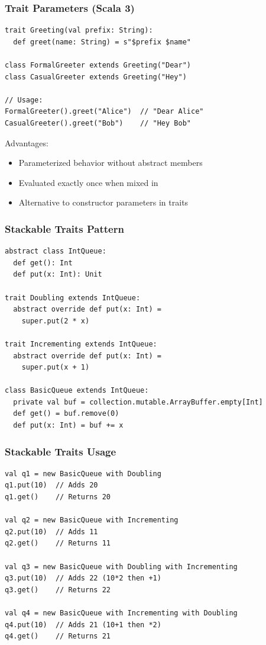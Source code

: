 \documentclass{beamer}
\begin{document}
\begin{frame}[fragile]
\frametitle{Trait Parameters (Scala 3)}
\begin{lstlisting}[style=scala]
trait Greeting(val prefix: String):
  def greet(name: String) = s"$prefix $name"

class FormalGreeter extends Greeting("Dear")
class CasualGreeter extends Greeting("Hey")

// Usage:
FormalGreeter().greet("Alice")  // "Dear Alice"
CasualGreeter().greet("Bob")    // "Hey Bob"
\end{lstlisting}

Advantages:
\begin{itemize}
\item Parameterized behavior without abstract members
\item Evaluated exactly once when mixed in
\item Alternative to constructor parameters in traits
\end{itemize}
\end{frame}

\begin{frame}[fragile]
\frametitle{Stackable Traits Pattern}
\begin{lstlisting}[style=scala]
abstract class IntQueue:
  def get(): Int
  def put(x: Int): Unit

trait Doubling extends IntQueue:
  abstract override def put(x: Int) = 
    super.put(2 * x)

trait Incrementing extends IntQueue:
  abstract override def put(x: Int) = 
    super.put(x + 1)

class BasicQueue extends IntQueue:
  private val buf = collection.mutable.ArrayBuffer.empty[Int]
  def get() = buf.remove(0)
  def put(x: Int) = buf += x
\end{lstlisting}
\end{frame}

\begin{frame}[fragile]
\frametitle{Stackable Traits Usage}
\begin{lstlisting}[style=scala]
val q1 = new BasicQueue with Doubling
q1.put(10)  // Adds 20
q1.get()    // Returns 20

val q2 = new BasicQueue with Incrementing
q2.put(10)  // Adds 11
q2.get()    // Returns 11

val q3 = new BasicQueue with Doubling with Incrementing
q3.put(10)  // Adds 22 (10*2 then +1)
q3.get()    // Returns 22

val q4 = new BasicQueue with Incrementing with Doubling
q4.put(10)  // Adds 21 (10+1 then *2)
q4.get()    // Returns 21
\end{lstlisting}
\end{frame}
\end{document}
